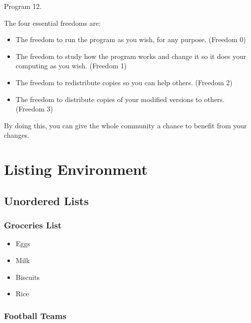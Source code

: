 Program 12.                   \documentclass[12pt]{report}
\begin{document}
The four essential freedoms are:

\begin{itemize}
\item The freedom to run the program as you wish,
for any purpose. (Freedom 0)

\item The freedom to study how the program works
and change it so it does your computing as you wish.
(Freedom 1)

\item The freedom to redistribute copies so you can
help others. (Freedom 2)

\item The freedom to distribute copies of your
modified versions to others. (Freedom 3)
\end{itemize}

By doing this, you can give the whole community
a chance to benefit from your changes.


\chapter{Listing Environment}

\section{Unordered Lists}

\subsection{Groceries List}

\begin{itemize}
\item Eggs
\item Milk
\item Biscuits
\item Rice
\end{itemize}

\subsection{Football Teams}
\end{document}
